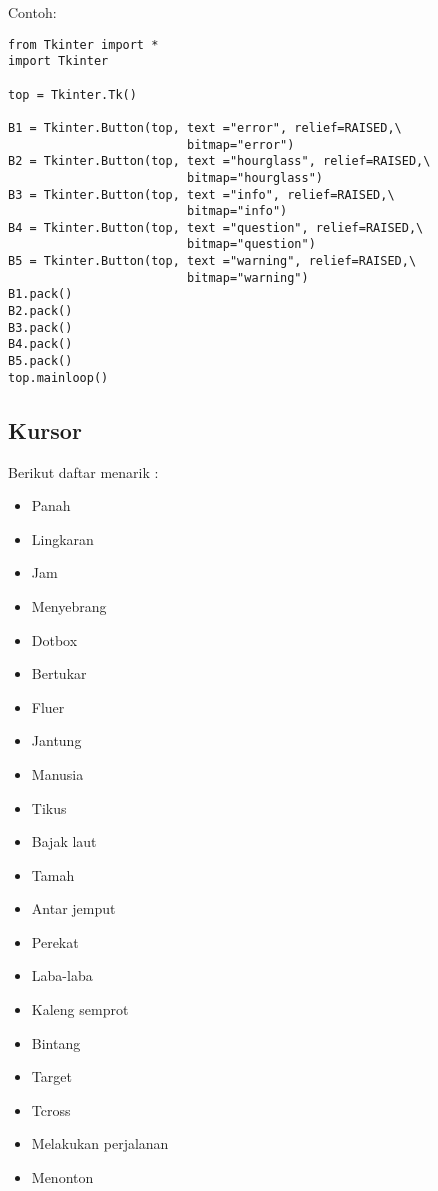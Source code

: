 \vspace{12pt}
Contoh: \par
\begin{verbatim}
from Tkinter import *
import Tkinter

top = Tkinter.Tk()

B1 = Tkinter.Button(top, text ="error", relief=RAISED,\
                         bitmap="error")
B2 = Tkinter.Button(top, text ="hourglass", relief=RAISED,\
                         bitmap="hourglass")
B3 = Tkinter.Button(top, text ="info", relief=RAISED,\
                         bitmap="info")
B4 = Tkinter.Button(top, text ="question", relief=RAISED,\
                         bitmap="question")
B5 = Tkinter.Button(top, text ="warning", relief=RAISED,\
                         bitmap="warning")
B1.pack()
B2.pack()
B3.pack()
B4.pack()
B5.pack()
top.mainloop()
\end{verbatim}

\noindent 
\subsection{Kursor} \par
\noindent 
Berikut daftar menarik : \par
\noindent 
\begin{itemize}
	\item Panah 
	\item Lingkaran
	\item Jam 
	\item Menyebrang 
	\item Dotbox 
	\item Bertukar
	\item Fluer 
	\item Jantung 
	\item Manusia 
	\item Tikus
	\item Bajak laut 
	\item Tamah 
	\item Antar jemput 
	\item Perekat
	\item Laba-laba
	\item Kaleng semprot
	\item Bintang
	\item Target 
	\item Tcross 
	\item Melakukan perjalanan
	\item Menonton
\end{itemize}

